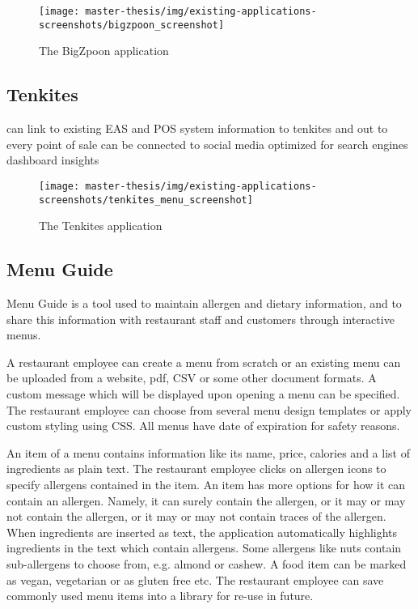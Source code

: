   \begin{figure}[h]
    \centering
    \texttt{[image: master-thesis/img/existing-applications-screenshots/bigzpoon\_screenshot]}
    \caption{The BigZpoon application}
  \end{figure}

\newpage

\subsection*{Tenkites}
  can link to existing EAS and POS system
  information to tenkites and out to every point of sale
  can be connected to social media
  optimized for search engines
  dashboard insights

  \begin{figure}[h]
    \centering
    \texttt{[image: master-thesis/img/existing-applications-screenshots/tenkites\_menu\_screenshot]}
    \caption{The Tenkites application}
  \end{figure}

\subsection*{Menu Guide}
  Menu Guide is a tool used to maintain allergen and dietary information, and to share this information with restaurant staff and customers through interactive menus.

  A restaurant employee can create a menu from scratch or an existing menu can be uploaded from a website, pdf, CSV or some other document formats. 
  A custom message which will be displayed upon opening a menu can be specified.
  The restaurant employee can choose from several menu design templates or apply custom styling using CSS.
  All menus have date of expiration for safety reasons.

  An item of a menu contains information like its name, price, calories and a list of ingredients as plain text.
  The restaurant employee clicks on allergen icons to specify allergens contained in the item.
  An item has more options for how it can contain an allergen. 
  Namely, it can surely contain the allergen, or it may or may not contain the allergen, or it may or may not contain traces of the allergen.
  When ingredients are inserted as text, the application automatically highlights ingredients in the text which contain allergens.
  Some allergens like nuts contain sub-allergens to choose from, e.g. almond or cashew.
  A food item can be marked as vegan, vegetarian or as gluten free etc.
  The restaurant employee can save commonly used menu items into a library for re-use in future. 

